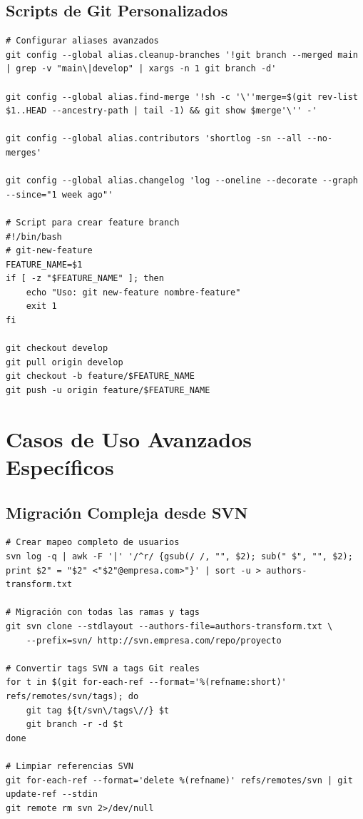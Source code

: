 \documentclass[12pt,a4paper]{article}
\begin{document}
\subsection{Scripts de Git Personalizados}
\begin{lstlisting}[caption=Aliases y scripts avanzados]
# Configurar aliases avanzados
git config --global alias.cleanup-branches '!git branch --merged main | grep -v "main\|develop" | xargs -n 1 git branch -d'

git config --global alias.find-merge '!sh -c '\''merge=$(git rev-list $1..HEAD --ancestry-path | tail -1) && git show $merge'\'' -'

git config --global alias.contributors 'shortlog -sn --all --no-merges'

git config --global alias.changelog 'log --oneline --decorate --graph --since="1 week ago"'

# Script para crear feature branch
#!/bin/bash
# git-new-feature
FEATURE_NAME=$1
if [ -z "$FEATURE_NAME" ]; then
    echo "Uso: git new-feature nombre-feature"
    exit 1
fi

git checkout develop
git pull origin develop
git checkout -b feature/$FEATURE_NAME
git push -u origin feature/$FEATURE_NAME
\end{lstlisting}

\section{Casos de Uso Avanzados Específicos}

\subsection{Migración Compleja desde SVN}
\begin{lstlisting}[caption=Migración avanzada con preservación de historia]
# Crear mapeo completo de usuarios
svn log -q | awk -F '|' '/^r/ {gsub(/ /, "", $2); sub(" $", "", $2); print $2" = "$2" <"$2"@empresa.com>"}' | sort -u > authors-transform.txt

# Migración con todas las ramas y tags
git svn clone --stdlayout --authors-file=authors-transform.txt \
    --prefix=svn/ http://svn.empresa.com/repo/proyecto

# Convertir tags SVN a tags Git reales
for t in $(git for-each-ref --format='%(refname:short)' refs/remotes/svn/tags); do
    git tag ${t/svn\/tags\//} $t
    git branch -r -d $t
done

# Limpiar referencias SVN
git for-each-ref --format='delete %(refname)' refs/remotes/svn | git update-ref --stdin
git remote rm svn 2>/dev/null
\end{lstlisting}
\end{document}

